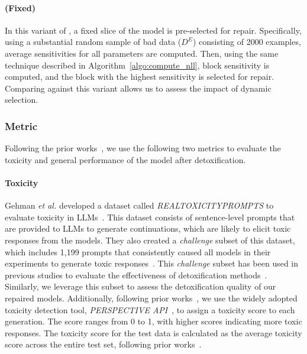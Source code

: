\paragraph{\nick (Fixed)} In this variant of \nick, a fixed slice of the model is pre-selected for repair. Specifically, using a substantial random sample of bad data ($D^E$) consisting of 2000 examples, average sensitivities for all parameters are computed. Then, using the same technique described in Algorithm~\ref{algo:compute_nll}, block sensitivity is computed, and the block with the highest sensitivity is selected for repair. Comparing \nick against this variant allows us to assess the impact of dynamic selection.

\subsubsection{Metric}

Following the prior works~\cite{gehman2020realtoxicityprompts,lee2024mechanistic,geva2022transformer}, we use the following two metrics to evaluate the toxicity and general performance of the model after detoxification.

\paragraph{Toxicity}Gehman \textit{et al.} developed a dataset called \textit{REALTOXICITYPROMPTS} to evaluate toxicity in LLMs~\cite{gehman2020realtoxicityprompts}. This dataset consists of sentence-level prompts that are provided to LLMs to generate continuations, which are likely to elicit toxic responses from the models. They also created a \textit{challenge} subset of this dataset, which includes 1,199 prompts that consistently caused all models in their experiments to generate toxic responses~\cite{gehman2020realtoxicityprompts}. This \textit{challenge} subset has been used in previous studies to evaluate the effectiveness of detoxification methods~\cite{lee2024mechanistic,geva2022transformer}. Similarly, we leverage this subset to assess the detoxification quality of our repaired models. Additionally, following prior works~\cite{geva2022transformer,lee2024mechanistic,gehman2020realtoxicityprompts}, we use the widely adopted toxicity detection tool, \textit{PERSPECTIVE API}~\cite{papi}, to assign a toxicity score to each generation. The score ranges from 0 to 1, with higher scores indicating more toxic responses. The toxicity score for the test data is calculated as the average toxicity score across the entire test set, following prior works~\cite{lee2024mechanistic}.



